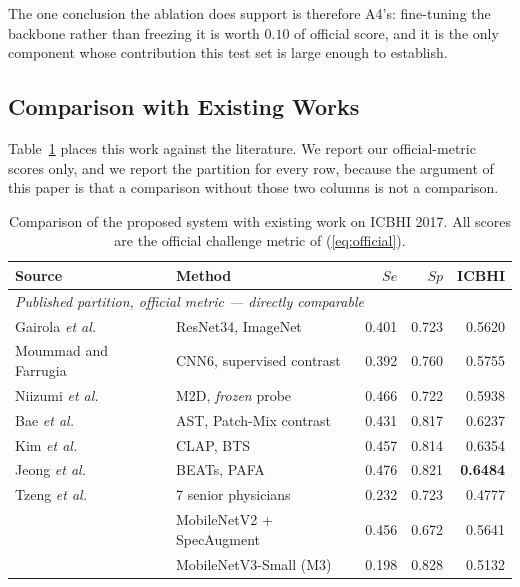 \documentclass[journal,onecolumn]{IEEEtran}
\newcommand{\best}[1]{\textbf{#1}}
\begin{document}
The one conclusion the ablation does support is therefore A4's: fine-tuning the backbone
rather than freezing it is worth $0.10$ of official score, and it is the only component
whose contribution this test set is large enough to establish.

\subsection{Comparison with Existing Works}
\label{subsec:comparison}

Table~\ref{tab:comparison} places this work against the literature. We report our
official-metric scores only, and we report the partition for every row, because the
argument of this paper is that a comparison without those two columns is not a
comparison.

\begin{table}[!t]
\centering
\caption{Comparison of the proposed system with existing work on ICBHI 2017. All
scores are the official challenge metric of (\ref{eq:official}).}
\label{tab:comparison}
\begin{tabular}{llrrr}
\toprule
Source & Method & $Se$ & $Sp$ & ICBHI \\
\midrule
\multicolumn{5}{l}{\emph{Published partition, official metric --- directly comparable}}\\
Gairola \emph{et al.}~\cite{respirenet2021}  & ResNet34, ImageNet       & 0.401 & 0.723 & 0.5620 \\
Moummad and Farrugia~\cite{scl2023}          & CNN6, supervised contrast & 0.392 & 0.760 & 0.5755 \\
Niizumi \emph{et al.}~\cite{frozenfm2025}    & M2D, \emph{frozen} probe & 0.466 & 0.722 & 0.5938 \\
Bae \emph{et al.}~\cite{bae2023patchmix}     & AST, Patch-Mix contrast  & 0.431 & 0.817 & 0.6237 \\
Kim \emph{et al.}~\cite{bts2024}             & CLAP, BTS                & 0.457 & 0.814 & 0.6354 \\
Jeong \emph{et al.}~\cite{pafa2025}          & BEATs, PAFA              & 0.476 & 0.821 & \best{0.6484} \\
Tzeng \emph{et al.}~\cite{tzeng2025jmir}     & 7 senior physicians      & 0.232 & 0.723 & 0.4777 \\
\addlinespace
\multirow{3}{*}{This work} & MobileNetV2 + SpecAugment & 0.456 & 0.672 & 0.5641 \\
                           & MobileNetV3-Small (M3)    & 0.198 & 0.828 & 0.5132 \\

\end{tabular}
\end{table}
\end{document}
